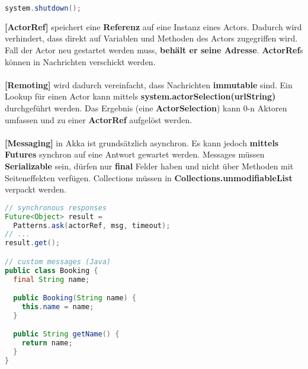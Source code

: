 \documentclass[8pt]{extarticle}
\let\oldtextbf\textbf
\renewcommand{\textbf}{\tiny\oldtextbf}
\begin{document}
\begin{multicols*}{5}
\begin{lstlisting}[language=java]
system.shutdown();
\end{lstlisting}
\textbf{[ActorRef]} speichert eine \textbf{Referenz} auf eine Instanz eines Actors. Dadurch wird verhindert, dass direkt auf Variablen und Methoden des Actors zugegriffen wird. Fall der Actor neu gestartet werden muss, \textbf{behält er seine Adresse}. \textbf{ActorRef}s können in Nachrichten verschickt werden.\\\\
\textbf{[Remoting]} wird dadurch vereinfacht, dass Nachrichten \textbf{immutable} sind. Ein Lookup für einen Actor kann mittels \textbf{system.actorSelection(urlString)} durchgeführt werden. Das Ergebnis (eine \textbf{ActorSelection}) kann 0-n Aktoren umfassen und zu einer \textbf{ActorRef} aufgelöst werden.\\\\
\textbf{[Messaging]} in Akka ist grundsätzlich asynchron. Es kann jedoch \textbf{mittels Futures} synchron auf eine Antwort gewartet werden. Messages müssen \textbf{Serializable} sein, dürfen nur \textbf{final} Felder haben und nicht über Methoden mit Seiteneffekten verfügen. Collections müssen in \textbf{Collections.unmodifiableList} verpackt werden.
\begin{lstlisting}[language=java]
// synchronous responses
Future<Object> result =
  Patterns.ask(actorRef, msg, timeout);
// ...
result.get();

// custom messages (Java)
public class Booking {
  final String name;

  public Booking(String name) {
    this.name = name;
  }

  public String getName() {
    return name;
  }
}


\end{lstlisting}
\end{multicols*}
\end{document}
